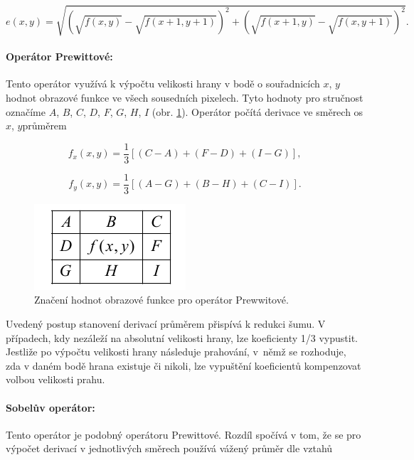 \begin{equation} \label{eq:8_8}
    e(x,y)=\sqrt{\left(\sqrt{f(x,y)} -\sqrt{f(x+1,y+1)} \right)^{2} +\left(\sqrt{f(x+1,y)} -\sqrt{f(x,y+1)} \right)^{2} } .   
\end{equation} 

\paragraph{Operátor Prewittové:} Tento operátor využívá k výpočtu velikosti hrany v bodě o souřadnicích $x$, $y$  hodnot obrazové funkce ve všech sousedních pixelech. Tyto hodnoty pro stručnost označíme $A$, $B$, $C$, $D$, $F$, $G$, $H$, $I$ (obr. \ref{img:8_4}). Operátor počítá derivace ve směrech os $x$, $y $průměrem

\begin{equation}
    f_{x} \left(x,y\right)=\frac{1}{3} \left[\left(C-A\right)+\left(F-D\right)+\left(I-G\right)\right], \nonumber
\end{equation} 

\begin{equation} \label{eq:8_9}
f_{y} \left(x,y\right)=\frac{1}{3} \left[\left(A-G\right)+\left(B-H\right)+\left(C-I\right)\right].  
\end{equation}

\begin{figure}[th]
    \begin{center}
        \includegraphics[scale=1.0]{08_segmentace/images/img_8_4.pdf}
    \end{center}
    \caption{Značení hodnot obrazové funkce pro operátor Prewwitové.}
    \label{img:8_4}
\end{figure}

Uvedený postup stanovení derivací průměrem přispívá k redukci šumu. V případech, kdy nezáleží na absolutní velikosti hrany, lze koeficienty 1/3 vypustit. Jestliže po výpočtu velikosti hrany následuje prahování, v~němž se rozhoduje, zda v daném bodě hrana existuje či nikoli, lze vypuštění koeficientů kompenzovat volbou velikosti prahu.

\paragraph{Sobelův operátor:} Tento operátor je podobný operátoru Prewittové. Rozdíl spočívá v tom, že se pro výpočet derivací v jednotlivých směrech používá vážený průměr dle vztahů

